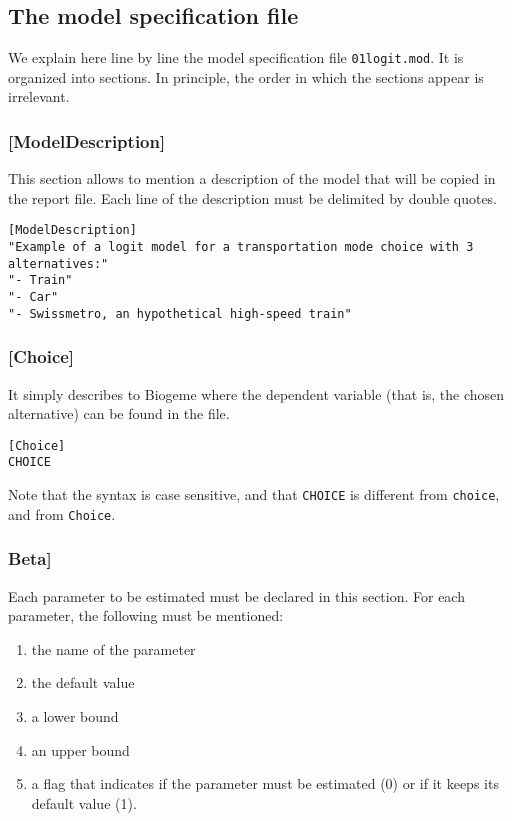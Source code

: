 \documentclass[12pt]{memoir}
\begin{document}
\subsection{The model specification file}
We explain here line by line the model specification file \texttt{01logit.mod}. It is organized into sections. In principle, the order in which the sections appear is irrelevant.

\subsubsection{[ModelDescription]}

This section allows to mention a description of the model that will be
copied in the report file. Each line of the description must be
delimited by double quotes.

{\footnotesize
\begin{verbatim}
[ModelDescription]
"Example of a logit model for a transportation mode choice with 3 alternatives:"
"- Train"
"- Car"
"- Swissmetro, an hypothetical high-speed train"
\end{verbatim}
}

\subsubsection{[Choice]}
It simply describes to Biogeme where the dependent variable (that is, the chosen alternative) can be found in the file. 
{\footnotesize
\begin{verbatim}
[Choice]
CHOICE   
\end{verbatim}
}
  Note that the syntax is case sensitive, and that \texttt{CHOICE} is different from \texttt{choice}, and from \texttt{Choice}. 

\subsubsection{Beta]}

Each parameter to be estimated must be declared in this section. For each parameter, the following must be mentioned:
\begin{enumerate}
\item the name of the parameter
\item the default value
\item a lower bound
\item an upper bound
\item a flag that indicates if the parameter must be estimated (0) or if it keeps its default value (1).
\end{enumerate}
\end{document}
